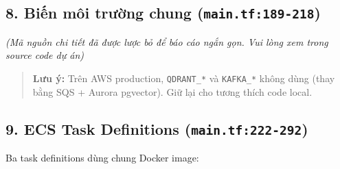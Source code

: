 \begin{Shaded}
\begin{Highlighting}[]
\NormalTok{\}}
\end{Highlighting}
\end{Shaded}

\hypertarget{biux1ebfn-muxf4i-trux1b0ux1eddng-chung-main.tf189-218}{%
\subsection{\texorpdfstring{8. Biến môi trường chung
(\texttt{main.tf:189-218})}{8. Biến môi trường chung (main.tf:189-218)}}}

\emph{(Mã nguồn chi tiết đã được lược bỏ để báo cáo ngắn gọn. Vui lòng
xem trong source code dự án)}

\begin{quote}
\textbf{Lưu ý:} Trên AWS production, \texttt{QDRANT\_*} và
\texttt{KAFKA\_*} không dùng (thay bằng SQS + Aurora pgvector). Giữ lại
cho tương thích code local.
\end{quote}

\hypertarget{ecs-task-definitions-main.tf222-292}{%
\subsection{\texorpdfstring{9. ECS Task Definitions
(\texttt{main.tf:222-292})}{9. ECS Task Definitions (main.tf:222-292)}}}

Ba task definitions dùng chung Docker image:


